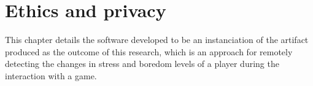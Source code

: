 \chapter{Ethics and privacy}
\label{ch:ethics}

This chapter details the software developed to be an instanciation of the artifact produced as the outcome of this research, which is an approach for remotely detecting the changes in stress and boredom levels of a player during the interaction with a game.
